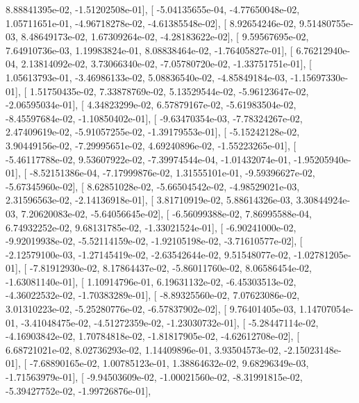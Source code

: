 \documentclass{article}
\begin{document}
          8.88841395e-02,  -1.51202508e-01],
       [ -5.04135655e-04,  -4.77650048e-02,   1.05711651e-01,
         -4.96718278e-02,  -4.61385548e-02],
       [  8.92654246e-02,   9.51480755e-03,   8.48649173e-02,
          1.67309264e-02,  -4.28183622e-02],
       [  9.59567695e-02,   7.64910736e-03,   1.19983824e-01,
          8.08838464e-02,  -1.76405827e-01],
       [  6.76212940e-04,   2.13814092e-02,   3.73066340e-02,
         -7.05780720e-02,  -1.33751751e-01],
       [  1.05613793e-01,  -3.46986133e-02,   5.08836540e-02,
         -4.85849184e-03,  -1.15697330e-01],
       [  1.51750435e-02,   7.33878769e-02,   5.13529544e-02,
         -5.96123647e-02,  -2.06595034e-01],
       [  4.34823299e-02,   6.57879167e-02,  -5.61983504e-02,
         -8.45597684e-02,  -1.10850402e-01],
       [ -9.63470354e-03,  -7.78324267e-02,   2.47409619e-02,
         -5.91057255e-02,  -1.39179553e-01],
       [ -5.15242128e-02,   3.90449156e-02,  -7.29995651e-02,
          4.69240896e-02,  -1.55223265e-01],
       [ -5.46117788e-02,   9.53607922e-02,  -7.39974544e-04,
         -1.01432074e-01,  -1.95205940e-01],
       [ -8.52151386e-04,  -7.17999876e-02,   1.31555101e-01,
         -9.59396627e-02,  -5.67345960e-02],
       [  8.62851028e-02,  -5.66504542e-02,  -4.98529021e-03,
          2.31596563e-02,  -2.14136918e-01],
       [  3.81710919e-02,   5.88614326e-03,   3.30844924e-03,
          7.20620083e-02,  -5.64056645e-02],
       [ -6.56099388e-02,   7.86995588e-04,   6.74932252e-02,
          9.68131785e-02,  -1.33021524e-01],
       [ -6.90241000e-02,  -9.92019938e-02,  -5.52114159e-02,
         -1.92105198e-02,  -3.71610577e-02],
       [ -2.12579100e-03,  -1.27145419e-02,  -2.63542644e-02,
          9.51548077e-02,  -1.02781205e-01],
       [ -7.81912930e-02,   8.17864437e-02,  -5.86011760e-02,
          8.06586454e-02,  -1.63081140e-01],
       [  1.10914796e-01,   6.19631132e-02,  -6.45303513e-02,
         -4.36022532e-02,  -1.70383289e-01],
       [ -8.89325560e-02,   7.07623086e-02,   3.01310223e-02,
         -5.25280776e-02,  -6.57837902e-02],
       [  9.76401405e-03,   1.14707054e-01,  -3.41048475e-02,
         -4.51272359e-02,  -1.23030732e-01],
       [ -5.28447114e-02,  -4.16903842e-02,   1.70784818e-02,
         -1.81817905e-02,  -4.62612708e-02],
       [  6.68721021e-02,   8.02736293e-02,   1.14409896e-01,
          3.93504573e-02,  -2.15023148e-01],
       [ -7.68890165e-02,   1.00785123e-01,   1.38864632e-02,
          9.68296349e-03,  -1.71563979e-01],
       [ -9.94503609e-02,  -1.00021560e-02,  -8.31991815e-02,
         -5.39427752e-02,  -1.99726876e-01],
\end{document}

